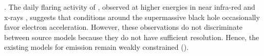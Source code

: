 \citep[see][and references therein]{2018arXiv180501242P, 2018ApJ...865..104J}.
The daily flaring activity of \sgra, observed at higher energies in near infra-red and x-rays \citep[e.g.,][]{2009ApJ...698..676D, 2019ApJ...886...96H}, suggests that conditions around the supermassive black hole occasionally favor electron acceleration.
However, these observations do not discriminate between source models because they do not have sufficient resolution. Hence, the existing models for \sgra emission remain weakly constrained ().

